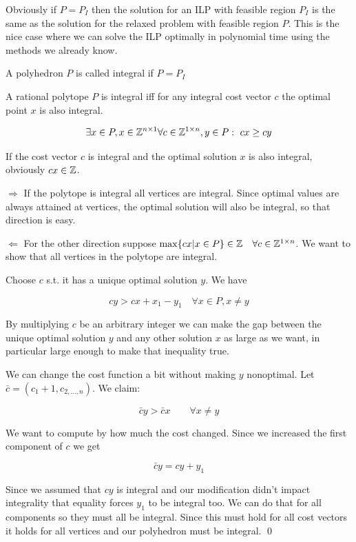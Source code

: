 Obviously if $P=P_I$ then the solution for an ILP with feasible region $P_I$ is the same as the solution for the relaxed problem with feasible region $P$. This is the nice case where we can solve the ILP optimally in polynomial time using the methods we already know.

\begin{Def} A polyhedron $P$ is called integral if $P=P_I$\end{Def}

\begin{thm}\label{Thm:polyIntegrality} A rational polytope $P$ is integral iff for any integral cost vector $c$ the optimal point $x$ is also integral.

\[\exists x\in P,x\in \mathbb{Z}^{n\times 1}\forall c\in \mathbb{Z}^{1\times n}, y \in P:\ cx\geq cy\] 
\end{thm}

If the cost vector $c$ is integral and the optimal solution $x$ is also integral, obviously $cx\in \mathbb{Z}$.

\begin{pr} $\Rightarrow$ If the polytope is integral all vertices are integral. Since optimal values are always attained at vertices, the optimal solution will also be integral, so that direction is easy.

$\Leftarrow$ For the other direction suppose $\max \{cx | x\in P\}\in \mathbb{Z}\quad \forall c\in \mathbb{Z}^{1\times n}$. We want to show that all vertices in the polytope are integral.

Choose $c$ s.t. it has a unique optimal solution $y$. We have 

\[cy>cx + x_1 -y_1 \quad \forall x\in P,x\neq y\]

By multiplying $c$ be an arbitrary integer we can make the gap between the unique optimal solution $y$ and any other solution $x$ as large as we want, in particular large enough to make that inequality true.

We can change the cost function a bit without making $y$ nonoptimal. Let $\bar c = (c_1+1,c_{2,\ldots,n})$. We claim:

\[\bar c y > \bar c x\qquad \forall x\neq y\]

We want to compute by how much the cost changed. Since we increased the first component of $c$ we get

\[\bar c y = cy+y_1\]

Since we assumed that $cy$ is integral and our modification didn't impact integrality that equality forces $y_1$ to be integral too. We can do that for all components so they must all be integral. Since this must hold for all cost vectors it holds for all vertices and our polyhedron must be integral.
\qed \end{pr}

